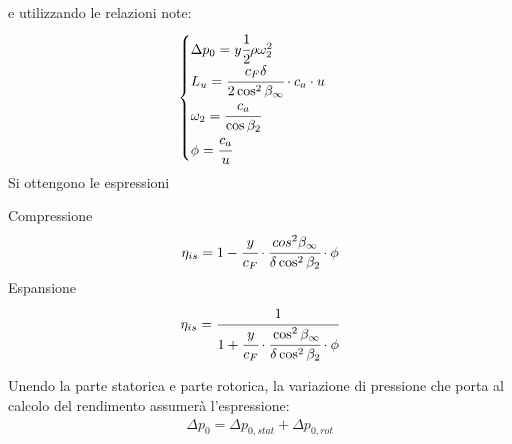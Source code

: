 e utilizzando le relazioni note:
\begin{align*}
\begin{cases}
\Delta p_0 = y \cfrac{1}{2} \rho \omega_2^2\\
L_u = \cfrac{c_F \delta}{2 \cos^2 \beta_{\infty}} \cdot c_a \cdot u\\
\omega_2 = \cfrac{c_a}{\cos \beta_2}\\
\phi = \cfrac{c_a}{u}
\end{cases}
\end{align*}
Si ottengono le espressioni
\begin{multicols}{2}
Compressione
\begin{align*}
\eta_{is} = 1- \cfrac{y}{c_F} \cdot  \cfrac{cos^2 \beta_{\infty}}{\delta \cos^2 \beta_2} \cdot \phi
\end{align*}
\break
Espansione
\begin{align*}
\eta_{is} = \cfrac{1}{1+\cfrac{y}{c_F} \cdot \cfrac{\cos^2 \beta_{\infty}}{\delta \cos^2 \beta_2} \cdot \phi}
\end{align*}
\end{multicols}
Unendo la parte statorica e parte rotorica, la variazione di pressione che porta al calcolo del rendimento assumerà l'espressione:
\begin{align*}
\Delta p_0 = \Delta p_{0,stat} + \Delta p_{0,rot}
\end{align*}
